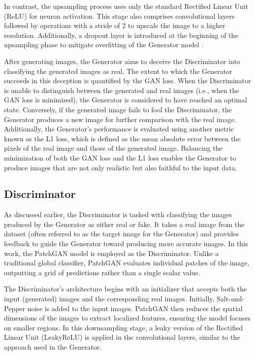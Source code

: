 In contrast, the upsampling process uses only the standard Rectified Linear Unit (ReLU) for neuron activation. This stage also comprises convolutional layers followed by operations with a stride of 2 to upscale the image to a higher resolution. Additionally, a dropout layer is introduced at the beginning of the upsampling phase to mitigate overfitting of the Generator model \citep{isola2017image}.

After generating images, the Generator aims to deceive the Discriminator into classifying the generated images as real. The extent to which the Generator succeeds in this deception is quantified by the GAN loss. When the Discriminator is unable to distinguish between the generated and real images (i.e., when the GAN loss is minimized), the Generator is considered to have reached an optimal state. Conversely, if the generated image fails to fool the Discriminator, the Generator produces a new image for further comparison with the real image. Additionally, the Generator's performance is evaluated using another metric known as the L1 loss, which is defined as the mean absolute error between the pixels of the real image and those of the generated image. Balancing the minimization of both the GAN loss and the L1 loss enables the Generator to produce images that are not only realistic but also faithful to the input data. 

\subsection{Discriminator}
As discussed earlier, the Discriminator is tasked with classifying the images produced by the Generator as either real or fake. It takes a real image from the dataset (often referred to as the target image for the Generator) and provides feedback to guide the Generator toward producing more accurate images. In this work, the PatchGAN model \citep{isola2017image} is employed as the Discriminator. Unlike a traditional global classifier, PatchGAN evaluates individual patches of the image, outputting a grid of predictions rather than a single scalar value.

The Discriminator’s architecture begins with an initializer that accepts both the input (generated) images and the corresponding real images. Initially, Salt-and-Pepper noise is added to the input images. PatchGAN then reduces the spatial dimensions of the images to extract localized features, ensuring the model focuses on smaller regions. In this downsampling stage, a leaky version of the Rectified Linear Unit (LeakyReLU) is applied in the convolutional layers, similar to the approach used in the Generator.

